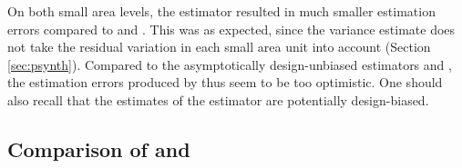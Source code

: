 On both small area levels, the \psynth{} estimator resulted in much smaller estimation errors compared to \psmall{} and \extpsynth{}. This was as expected, since the \psynth{} variance estimate does not take the residual variation in each small area unit into account (Section \ref{sec:psynth}). Compared to the asymptotically design-unbiased estimators \psmall{} and \extpsynth{}, the estimation errors produced by \psynth{} thus seem to be too optimistic. One should also recall that the estimates of the \psynth{} estimator are potentially design-biased.


\subsection{Comparison of \psmall{} and \extpsynth{}}
\label{sec:comp}

